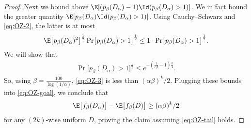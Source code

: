 \begin{proof}
    Next we bound above $\E[(p_\beta(D_\alpha)-1) \Id(p_\beta(D_\alpha) > 1)]$.  We in fact bound the greater quantity $\E[p_\beta(D_\alpha) \Id(p_\beta(D_\alpha) > 1)]$.
    Using Cauchy--Schwarz and \cref{eq:OZ-2}, the latter is at most
    \begin{align} \label{eq:OZ-3}
      \E\bigl[p_\beta(D_\alpha)^2\bigr]^{\frac{1}{2}} \Pr\bigl[p_\beta(D_\alpha) > 1\bigr]^{\frac{1}{2}}
      \le 1 \cdot \Pr\bigl[p_\beta(D_\alpha) > 1\bigr]^{\frac{1}{2}} .
    \end{align}
    We will show that 
    \begin{align} \label{eq:OZ-tail}
      \Pr\bigl[p_\beta(D_\alpha) > 1\bigr]^{\frac{1}{2}}
      \le e^{-(\frac{1}{e\beta} - 1)\frac{k}{4}} .
    \end{align}
    So, using $\beta = \frac{100}{\log(1/\alpha)}$, \cref{eq:OZ-3} is less than $(\alpha \beta)^k/2$.
    Plugging these bounds into \cref{eq:OZ-goal}, we conclude that
    \[
      \E\bigl[f_\beta(D_\alpha)\bigr] - \E\bigl[f_\beta(D)\bigr]
      \ge (\alpha \beta)^k/2
    \]
    for any $(2k)$-wise uniform $D$, proving the claim assuming \cref{eq:OZ-tail} holds.

    \medskip


\end{proof}

